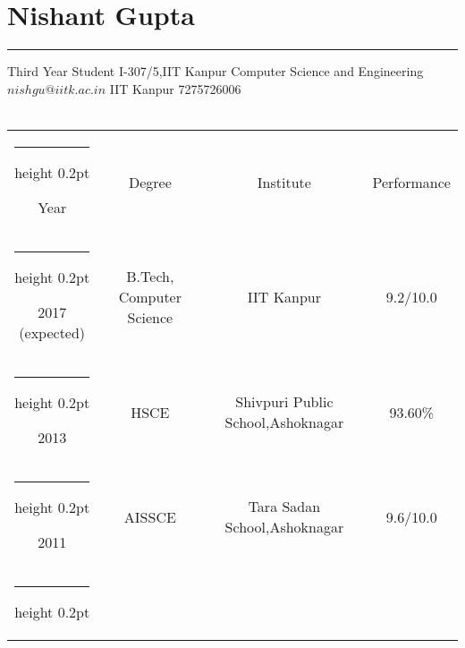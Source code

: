 \documentclass[a4paper]{article}
\author{Nishant Gupta}
\begin{document}

\section*{\textbf\Huge Nishant Gupta}
\hrule
\vspace{2mm}
Third Year Student  \hfill {I-307/5,IIT Kanpur} \newline
Computer Science and Engineering \hfill ${nishgu@iitk.ac.in}$ \newline
IIT Kanpur \hfill  {7275726006} \\ \\

\makeatletter
\newcommand{\thickhline}{%
    \noalign {\ifnum 0=`}\fi \hrule height 1pt
    \futurelet \reserved@a \@xhline
}

\makeatletter
\newcommand{\thinhline}{%
    \noalign {\ifnum 0=`}\fi \hrule height 0.2pt
    \futurelet \reserved@a \@xhline
}


\begin{center}
  \begin{tabular}{|c|c|c|c|} 
    \thinhline
    {\centering Year} & {\centering Degree} & {\centering Institute} & {\centering Performance} \\  
    \thinhline
    2017 (expected) & {B.Tech,  Computer Science} & IIT Kanpur  & 9.2/10.0  \\ 
    \thinhline
    2013 & {HSCE} & Shivpuri Public School,Ashoknagar & 			93.60\%	\\
    \thinhline
    2011 & AISSCE & Tara Sadan School,Ashoknagar  & 9.6/10.0   \\
    \thinhline

  \end{tabular}
\end{center}
\end{document}

